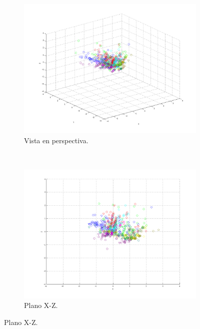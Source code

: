\documentclass[informe.tex]{subfiles}
\begin{document}
	\begin{figure}[H]
        \centering
        \hspace*{-6.5cm}
        \begin{subfigure}[b]{0.49\textwidth}
                \includegraphics[width=\textwidth]{graficos/fold1_criterioParadao_reglaM_alpha0_rep1_0P.png}
                \caption{Vista en perspectiva.}
        \end{subfigure}%
        ~
        \begin{subfigure}[b]{0.49\textwidth}
                \includegraphics[width=\textwidth]{graficos/fold1_criterioParadao_reglaM_alpha0_rep1_1XZ.png}
                \caption{Plano X-Z.}
        \end{subfigure}
        

\end{figure}
\end{document}
